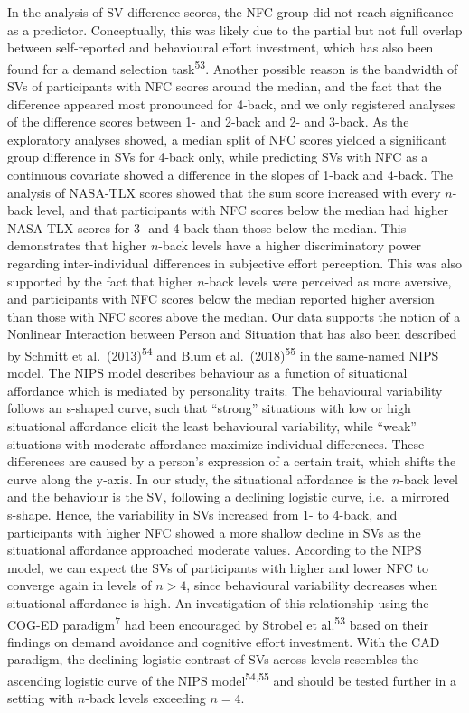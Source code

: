 \documentclass[
  man,floatsintext]{apa6}
\begin{document}
In the analysis of SV difference scores, the NFC group did not reach significance as a predictor.
Conceptually, this was likely due to the partial but not full overlap between self-reported and behavioural effort investment, which has also been found for a demand selection task\textsuperscript{53}.
Another possible reason is the bandwidth of SVs of participants with NFC scores around the median, and the fact that the difference appeared most pronounced for 4-back, and we only registered analyses of the difference scores between 1- and 2-back and 2- and 3-back.
As the exploratory analyses showed, a median split of NFC scores yielded a significant group difference in SVs for 4-back only, while predicting SVs with NFC as a continuous covariate showed a difference in the slopes of 1-back and 4-back.
The analysis of NASA-TLX scores showed that the sum score increased with every \(n\)-back level, and that participants with NFC scores below the median had higher NASA-TLX scores for 3- and 4-back than those below the median.
This demonstrates that higher \(n\)-back levels have a higher discriminatory power regarding inter-individual differences in subjective effort perception.
This was also supported by the fact that higher \(n\)-back levels were perceived as more aversive, and participants with NFC scores below the median reported higher aversion than those with NFC scores above the median.
Our data supports the notion of a Nonlinear Interaction between Person and Situation that has also been described by Schmitt et al.~(2013)\textsuperscript{54} and Blum et al.~(2018)\textsuperscript{55} in the same-named NIPS model.
The NIPS model describes behaviour as a function of situational affordance which is mediated by personality traits.
The behavioural variability follows an s-shaped curve, such that ``strong'' situations with low or high situational affordance elicit the least behavioural variability, while ``weak'' situations with moderate affordance maximize individual differences.
These differences are caused by a person's expression of a certain trait, which shifts the curve along the y-axis.
In our study, the situational affordance is the \(n\)-back level and the behaviour is the SV, following a declining logistic curve, i.e.~a mirrored s-shape.
Hence, the variability in SVs increased from 1- to 4-back, and participants with higher NFC showed a more shallow decline in SVs as the situational affordance approached moderate values.
According to the NIPS model, we can expect the SVs of participants with higher and lower NFC to converge again in levels of \(n>4\), since behavioural variability decreases when situational affordance is high.
An investigation of this relationship using the COG-ED paradigm\textsuperscript{7} had been encouraged by Strobel et al.\textsuperscript{53} based on their findings on demand avoidance and cognitive effort investment.
With the CAD paradigm, the declining logistic contrast of SVs across levels resembles the ascending logistic curve of the NIPS model\textsuperscript{54,55} and should be tested further in a setting with \(n\)-back levels exceeding \(n=4\).
\end{document}
